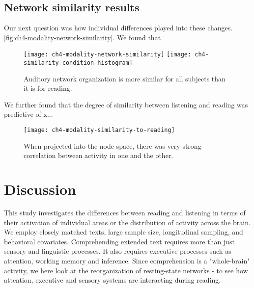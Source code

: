 
\subsection{Network similarity results}

Our next question was how individual differences played into these changes. 
\ref{fig:ch4-modality-network-similarity}. We found that 

\begin{figure}[t]
	\centering
	\texttt{[image: ch4-modality-network-similarity]}
	\texttt{[image: ch4-similarity-condition-histogram]}
    \caption[Auditory network organization is more similar for all subjects than it is for reading.]{Auditory network organization is more similar for all subjects than it is for reading.}
	\label{fig:modality-network-similarity}
\end{figure}

We further found that the degree of similarity between listening and reading was predictive of x...

\begin{figure}[t]
	\centering
	\texttt{[image: ch4-modality-similarity-to-reading]}
    \caption[Network similarity between listening and reading predicts word efficiency.]{When projected into the node space, there was very strong correlation between activity in one and the other.}
	\label{fig:ch4-modality-similarity-to-reading}
\end{figure}




\section{Discussion}

This study investigates the differences between reading and listening in terms of their activation of individual areas or the distribution of activity across the brain. We employ closely matched texts, large sample size, longitudinal sampling, and behavioral covariates. Comprehending extended text requires more than just sensory and linguistic processes. It also requires executive processes such as attention, working memory and inference. Since comprehension is a "whole-brain" activity, we here look at the reorganization of resting-state networks - to see how attention, executive and sensory systems are interacting during reading.

